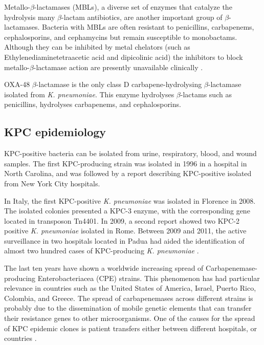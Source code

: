 \documentclass[11pt]{report}
\begin{document}
Metallo-$\beta$-lactamases (MBLs), a diverse set of enzymes that catalyze the hydrolysis many $\beta$-lactam antibiotics, are another important group of $\beta$-lactamases.
Bacteria with MBLs are often resistant to penicillins, carbapenems, cephalosporins, and cephamycins but remain susceptible to monobactams. Although they can be inhibited by metal chelators (such as Ethylenediaminetetraacetic acid and dipicolinic acid) the inhibitors to block metallo-$\beta$-lactamase action are presently unavailable clinically \cite{palzkill2013metallo}.

OXA-48 $\beta$-lactamase is the only class D carbapene-hydrolysing $\beta$-lactamase isolated from \emph{K. pneumoniae}.
This enzyme hydrolyses $\beta$-lactams such as penicillins, hydrolyses carbapenems, and cephalosporins.


\subsection{KPC epidemiology}

KPC-positive bacteria can be isolated from urine, respiratory, blood, and wound samples.
The first KPC-producing strain was isolated in 1996 in a hospital in North Carolina, and was followed by a report describing KPC-positive isolated from New York City hospitals.

In Italy, the first KPC-positive \emph{K. pneumoniae} was isolated in Florence in 2008.
The isolated colonies presented a KPC-3 enzyme, with the corresponding gene located in transposon Tn4401.
In 2009, a second report showed two KPC-2 positive \emph{K. pneumoniae} isolated in Rome.
Between 2009 and 2011, the active surveillance in two hospitals located in Padua had aided the identification of almost two hundred cases of KPC-producing \emph{K. pneumoniae} \cite{MunozPrice2013}.

The last ten years have shown a worldwide increasing spread of Carbapenemase-producing Enterobacteriacea (CPE) strains.
This phenomenon has had particular relevance in countries such as the United States of America, Israel, Puerto Rico, Colombia, and Greece.
The spread of carbapenemases across different strains is probably due to the dissemination of mobile genetic elements that can transfer their resistance genes to other microorganisms.
One of the causes for the spread of KPC epidemic clones is patient transfers either between different hospitals, or countries \cite{circolare2013}.
\end{document}
